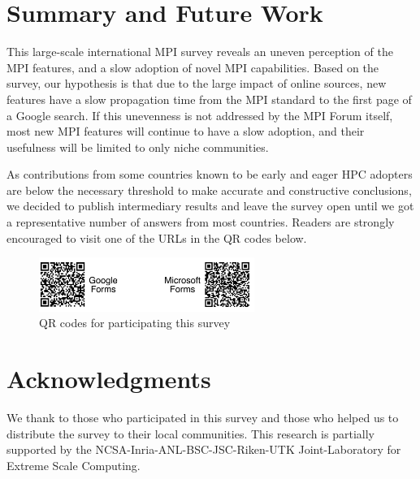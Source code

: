 \documentclass[sigconf,nonacm]{acmart}
\begin{document}
\section{Summary and Future Work}

This large-scale international MPI survey reveals an uneven perception of the
MPI features, and a slow adoption of novel MPI capabilities.
%
Based on the survey, our hypothesis is that due to the large impact of online
sources, new features have a slow propagation time from the MPI standard to
the first page of a Google search. If this unevenness is not addressed by the MPI
Forum itself, most new MPI features will continue to have a slow adoption, and
their usefulness will be limited to only niche communities.

As contributions from some countries known to be early and eager HPC adopters
are below the necessary threshold to make accurate and constructive
conclusions, we decided to publish intermediary results and leave the
survey open until we got a representative number of answers from most countries.
%
Readers are strongly encouraged to visit one of the URLs in the QR codes below.

\begin{figure}[htb]
\begin{center}
\includegraphics[width=7cm]{figs/QR-codes.pdf}
\vspace{-3mm}
\caption{QR codes for participating this survey}
\label{fig:qrcodes}
\end{center}
\vspace{-5mm}
\end{figure}

\section*{Acknowledgments}
{\small
We thank to those who participated in this survey and those who
helped us to distribute the survey to their local communities.
This research is partially supported by the
NCSA-Inria-ANL-BSC-JSC-Riken-UTK Joint-Laboratory for Extreme Scale
Computing\cite{JLESC}.
}


\end{document}
